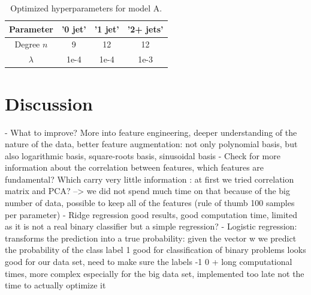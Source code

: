 \documentclass[10pt,conference,compsocconf]{IEEEtran}
\begin{document}
\begin{table}[]
    \centering
    \caption{Optimized hyperparameters for model A.}
    \label{tab:param}
    \begin{tabular}{|c|c|c|c|}
    \hline
     \textbf{Parameter} &  '0 jet' &  '1 jet' & '2+ jets'  \\
    \hline
    Degree $n$ & 9 & 12 & 12 \\
    \hline
     \textit{$\lambda$} & 1e-4 & 1e-4 & 1e-3  \\
    \hline
     \end{tabular}
     \vfill
\end{table}


\section{Discussion}
\label{sec:discussion}

-	What to improve? More into feature engineering, deeper understanding of the nature of the data, better feature augmentation: not only polynomial basis, but also logarithmic basis, square-roots basis, sinusoidal basis 
-	Check for more information about the correlation between features, which features are fundamental? Which carry very little information : at first we tried correlation matrix and PCA?  --> we did not spend much time on that because of the big number of data, possible to keep all of the features (rule of thumb 100 samples per parameter)
-	Ridge regression  good results, good computation time, limited as it is not a real binary classifier but a simple regression?
-	Logistic regression: transforms the prediction into a true probability: given the vector w we predict the probability of the class label 1 good for classification of binary problems looks good for our data set, need to make sure the labels -1  0 + long computational times, more complex especially for the big data set, implemented too late not the time to actually optimize it


%
%
\end{document}
